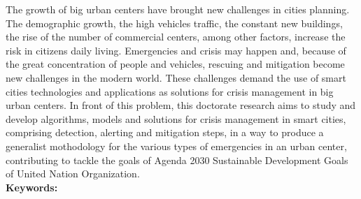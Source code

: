 \begin{thesisabastract}

The growth of big urban centers have brought new challenges in cities planning. The demographic growth, the high vehicles traffic, the constant new buildings, the rise of the number of commercial centers, among other factors, increase the risk in citizens daily living. Emergencies and crisis may happen and, because of the great concentration of people and vehicles, rescuing and mitigation become new challenges in the modern world. These challenges demand the use of smart cities technologies and applications as solutions for crisis management in big urban centers. In front of this problem, this doctorate research aims to study and develop algorithms, models and solutions for crisis management in smart cities, comprising detection, alerting and mitigation steps, in a way to produce a generalist mothodology for the various types of emergencies in an urban center, contributing to tackle the goals of Agenda 2030 Sustainable Development Goals of United Nation Organization.\\

\textbf{Keywords:} \ppgmkeywords

\end{thesisabastract}
